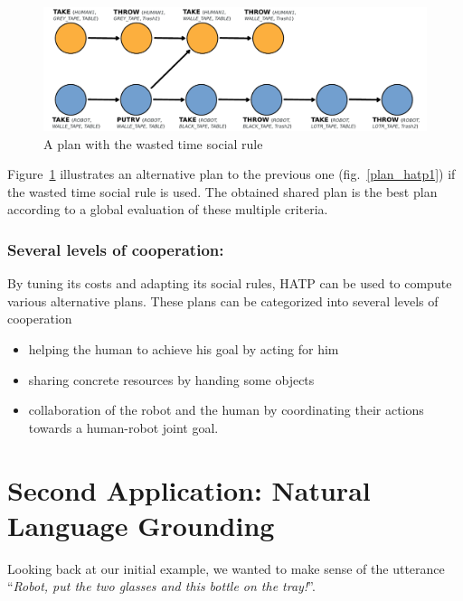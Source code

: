 \documentclass{svmult}
\begin{document}
\begin{figure}[htbp]
  \centering
  \includegraphics[width=0.95\columnwidth]{./figs/plan2.pdf}
  \caption{A plan with the wasted time social rule}
  \label{plan_hatp2}
\end{figure}

Figure~\ref{plan_hatp2} illustrates an alternative plan to the previous 
one (fig.~\ref{plan_hatp1}) if the wasted time social rule is used.
The obtained shared plan is the best plan according to a global evaluation of
these multiple criteria.

\subsubsection{Several levels of cooperation:} 

By tuning its costs
and adapting its social rules, HATP can be used to compute various
alternative plans. These plans can be categorized into several levels
of cooperation

\begin{itemize}
\item helping the human to achieve his goal by acting for him
\item sharing concrete resources by handing some objects
\item collaboration of the robot and the human by coordinating their
  actions towards a human-robot joint goal.
\end{itemize}





\section{Second Application: Natural Language Grounding}
\label{dialogs}

Looking back at our initial example, we wanted to make sense of the utterance
``\emph{Robot, put the two glasses and this bottle on the tray!}''.
\end{document}
